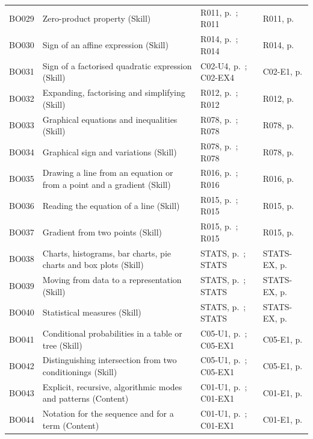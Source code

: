 \begin{longtable}{p{.1\linewidth}p{.43\linewidth}p{.19\linewidth}p{.16\linewidth}}
BO029 & Zero-product property (Skill) & R011, p.\,\pageref{R011} ; R011 & R011, p.\,\pageref{R011} \\
BO030 & Sign of an affine expression (Skill) & R014, p.\,\pageref{R014} ; R014 & R014, p.\,\pageref{R014} \\
BO031 & Sign of a factorised quadratic expression (Skill) & C02-U4, p.\,\pageref{C02-U4} ; C02-EX4 & C02-E1, p.\,\pageref{C02-E1} \\
BO032 & Expanding, factorising and simplifying (Skill) & R012, p.\,\pageref{R012} ; R012 & R012, p.\,\pageref{R012} \\
BO033 & Graphical equations and inequalities (Skill) & R078, p.\,\pageref{R078} ; R078 & R078, p.\,\pageref{R078} \\
BO034 & Graphical sign and variations (Skill) & R078, p.\,\pageref{R078} ; R078 & R078, p.\,\pageref{R078} \\
BO035 & Drawing a line from an equation or from a point and a gradient (Skill) & R016, p.\,\pageref{R016} ; R016 & R016, p.\,\pageref{R016} \\
BO036 & Reading the equation of a line (Skill) & R015, p.\,\pageref{R015} ; R015 & R015, p.\,\pageref{R015} \\
BO037 & Gradient from two points (Skill) & R015, p.\,\pageref{R015} ; R015 & R015, p.\,\pageref{R015} \\
BO038 & Charts, histograms, bar charts, pie charts and box plots (Skill) & STATS, p.\,\pageref{STATS} ; STATS & STATS-EX, p.\,\pageref{STATS-EX} \\
BO039 & Moving from data to a representation (Skill) & STATS, p.\,\pageref{STATS} ; STATS & STATS-EX, p.\,\pageref{STATS-EX} \\
BO040 & Statistical measures (Skill) & STATS, p.\,\pageref{STATS} ; STATS & STATS-EX, p.\,\pageref{STATS-EX} \\
BO041 & Conditional probabilities in a table or tree (Skill) & C05-U1, p.\,\pageref{C05-U1} ; C05-EX1 & C05-E1, p.\,\pageref{C05-E1} \\
BO042 & Distinguishing intersection from two conditionings (Skill) & C05-U1, p.\,\pageref{C05-U1} ; C05-EX1 & C05-E1, p.\,\pageref{C05-E1} \\
BO043 & Explicit, recursive, algorithmic modes and patterns (Content) & C01-U1, p.\,\pageref{C01-U1} ; C01-EX1 & C01-E1, p.\,\pageref{C01-E1} \\
BO044 & Notation for the sequence and for a term (Content) & C01-U1, p.\,\pageref{C01-U1} ; C01-EX1 & C01-E1, p.\,\pageref{C01-E1} \\

\end{longtable}
